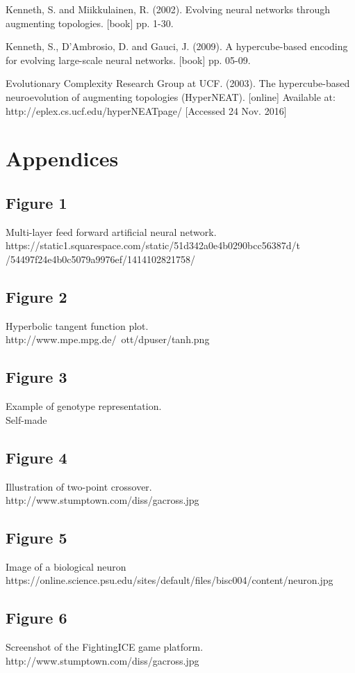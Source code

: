 \documentclass[12pt,a4paper]{article}
\begin{document}
\begin{thebibliography}{10}
	Kenneth, S. and Miikkulainen, R.
	(2002).
	Evolving neural networks through augmenting topologies.
	[book]
	pp. 1-30.
	
	Kenneth, S., D'Ambrosio, D. and Gauci, J.
	(2009).
	A hypercube-based encoding for evolving large-scale neural networks.
	[book]
	pp. 05-09.
	
	Evolutionary Complexity Research Group at UCF.
	(2003).
	The hypercube-based neuroevolution of augmenting topologies (HyperNEAT).
	[online]
	Available at: http://eplex.cs.ucf.edu/hyperNEATpage/
	[Accessed 24 Nov. 2016]
\end{thebibliography}
\newpage
\section{Appendices}
\subsection*{Figure 1}
Multi-layer feed forward artificial neural network.	\\
https://static1.squarespace.com/static/51d342a0e4b0290bcc56387d/t\\ /54497f24e4b0c5079a9976ef/1414102821758/
\subsection*{Figure 2}
Hyperbolic tangent function plot.\\
http://www.mpe.mpg.de/~ott/dpuser/tanh.png
\subsection*{Figure 3}
Example of genotype representation.\\
Self-made
\subsection*{Figure 4}
Illustration of two-point crossover.\\
http://www.stumptown.com/diss/gacross.jpg
\subsection*{Figure 5}
Image of a biological neuron\\
https://online.science.psu.edu/sites/default/files/bisc004/content/neuron.jpg
\subsection*{Figure 6}
Screenshot of the FightingICE game platform.\\
http://www.stumptown.com/diss/gacross.jpg
\end{document}

